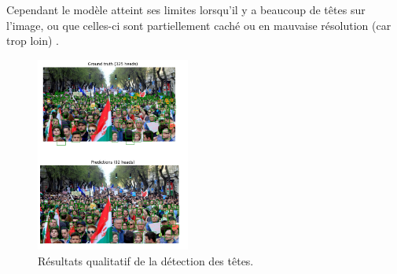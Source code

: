 Cependant le modèle atteint ses limites lorsqu'il y a beaucoup de têtes sur l'image, ou que celles-ci sont partiellement caché ou en mauvaise résolution (car trop loin)
.
\begin{figure}[h!]
    \centering
    \includegraphics[width=0.45\textwidth]{images/heads_detection.png}
    \caption{Résultats qualitatif de la détection des têtes.}
    \label{fig:heads-detection}
\end{figure}